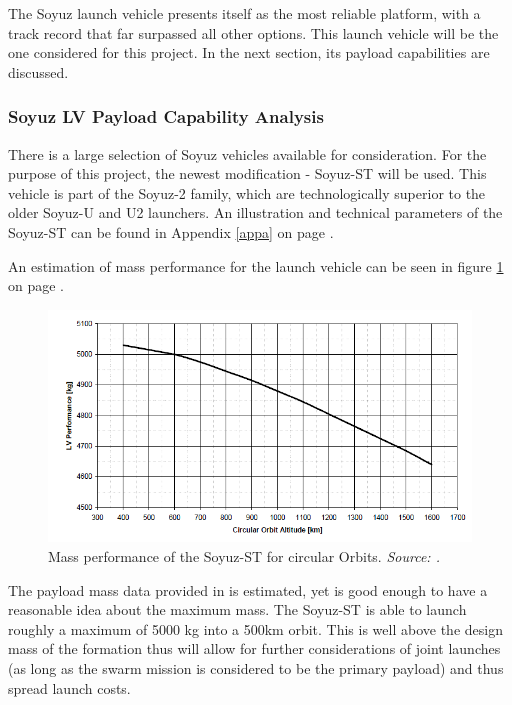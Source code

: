 The Soyuz launch vehicle presents itself as the most reliable platform, with a track record that far surpassed all other options. This launch vehicle will be the one considered for this project. In the next section, its payload capabilities are discussed.

\subsubsection{Soyuz LV Payload Capability Analysis}
\label{frLVPCA}

There is a large selection of Soyuz vehicles available for consideration. For the purpose of this project, the newest modification - Soyuz-ST will be used. This vehicle is part of the Soyuz-2 family, which are technologically superior to the older Soyuz-U and U2 launchers. An illustration and technical parameters of the Soyuz-ST can be found in Appendix \ref{appa} on page \pageref{appa} \cite{soyuzman}.

An estimation of mass performance for the launch vehicle can be seen in figure \ref{fig:massperformance} on page \pageref{fig:massperformance}.

\begin{figure}[ht]
\centering
\includegraphics[width=1.0\textwidth, angle=0]{chapters/img/lvmass.png}
\caption{Mass performance of the Soyuz-ST for circular Orbits.\emph{ Source: \cite{soyuzman}.}}
\label{fig:massperformance}
\end{figure}

The payload mass data provided in \cite{soyuzman} is estimated, yet is good enough to have a reasonable idea about the maximum mass. The Soyuz-ST is able to launch roughly a maximum of 5000 kg into a 500km orbit. This is well above the design mass of the formation thus will allow for further considerations of joint launches (as long as the swarm mission is considered to be the primary payload) and thus spread launch costs. 

